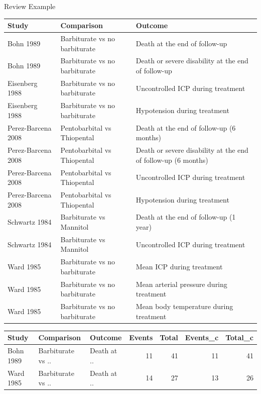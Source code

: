 \documentclass[english]{beamer}\usepackage[]{graphicx}\usepackage[]{color}
\begin{document}
\begin{frame}{Review Example}
\vspace{-5mm}
\begin{table}[ht]
\centering
\begingroup\tiny
\begin{tabular}{lll}
  \hline
Study & Comparison & Outcome \\ 
  \hline
Bohn 1989 & Barbiturate vs no barbiturate & Death at the end of follow-up \\ 
  Bohn 1989 & Barbiturate vs no barbiturate & Death or severe disability at the end of follow-up \\ 
  Eisenberg 1988 & Barbiturate vs no barbiturate & Uncontrolled ICP during treatment \\ 
  Eisenberg 1988 & Barbiturate vs no barbiturate & Hypotension during treatment \\ 
  Perez-Barcena 2008 & Pentobarbital vs Thiopental & Death at the end of follow-up (6 months) \\ 
  Perez-Barcena 2008 & Pentobarbital vs Thiopental & Death or severe disability at the end of follow-up (6 months) \\ 
  Perez-Barcena 2008 & Pentobarbital vs Thiopental & Uncontrolled ICP during treatment \\ 
  Perez-Barcena 2008 & Pentobarbital vs Thiopental & Hypotension during treatment \\ 
  Schwartz 1984 & Barbiturate vs Mannitol & Death at the end of follow-up (1 year) \\ 
  Schwartz 1984 & Barbiturate vs Mannitol & Uncontrolled ICP during treatment \\ 
  Ward 1985 & Barbiturate vs no barbiturate & Mean ICP during treatment \\ 
  Ward 1985 & Barbiturate vs no barbiturate & Mean arterial pressure during treatment \\ 
  Ward 1985 & Barbiturate vs no barbiturate & Mean body temperature during treatment \\ 
   \hline
\end{tabular}
\endgroup
\label{barbiturates}
\end{table}


\vspace{-6mm}
\begin{table}[ht]
\centering
\begingroup\tiny
\begin{tabular}{lllrrrr}
  \hline
Study & Comparison & Outcome & Events & Total & Events\_c & Total\_c \\ 
  \hline
Bohn 1989 & Barbiturate vs .. & Death at .. & 11 & 41 & 11 & 41 \\ 
  Ward 1985 & Barbiturate vs .. & Death at .. & 14 & 27 & 13 & 26 \\ 
   \hline
\end{tabular}
\endgroup
\label{barbiturate.row}
\end{table}

\end{frame}
\end{document}
